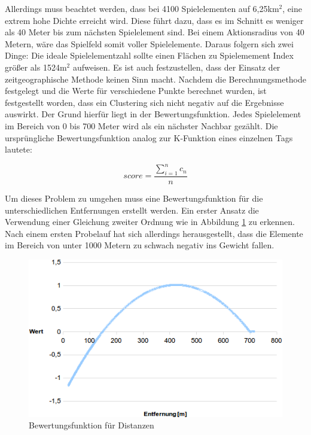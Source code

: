 Allerdings muss beachtet werden, dass bei 4100 Spielelementen auf 6,25km$^2$, eine extrem hohe Dichte erreicht wird. Diese führt dazu, dass es im Schnitt es weniger als 40 Meter bis zum nächsten Spielelement sind. Bei einem Aktionsradius von 40 Metern, wäre das Spielfeld somit voller Spielelemente. Daraus folgern sich zwei Dinge:
Die ideale Spielelementzahl sollte einen Flächen zu Spielemement Index größer als 1524m$^2$ aufweisen.
Es ist auch festzustellen, dass der Einsatz der zeitgeographische Methode keinen Sinn macht.
Nachdem die Berechnungsmethode festgelegt und die Werte für verschiedene Punkte berechnet wurden, ist festgestellt worden, dass ein Clustering sich nicht negativ auf die Ergebnisse auswirkt.
Der Grund hierfür liegt in der Bewertungsfunktion. Jedes Spielelement im Bereich von 0 bis 700 Meter wird als ein nächster Nachbar gezählt.
Die ursprüngliche Bewertungsfunktion analog zur K-Funktion eines einzelnen Tags lautete:

\begin{equation}
score = \frac{ \sum\limits_{i=1}^n c_n }{n}
\end{equation}

Um dieses Problem zu umgehen muss eine Bewertungsfunktion für die unterschiedlichen Entfernungen erstellt werden. Ein erster Ansatz die Verwendung einer Gleichung zweiter Ordnung wie in Abbildung \ref{img:ch6_img06_valued2} zu erkennen. Nach einem ersten Probelauf hat sich allerdings herausgestellt, dass die Elemente im Bereich von unter 1000 Metern zu schwach negativ ins Gewicht fallen.

\begin{figure}[H]
\begin{center}
\includegraphics[width=150mm]{images/ch6_img06_valued2.png}
\caption{Bewertungsfunktion für Distanzen}
\label{img:ch6_img06_valued2}
\end{center}
\end{figure}

